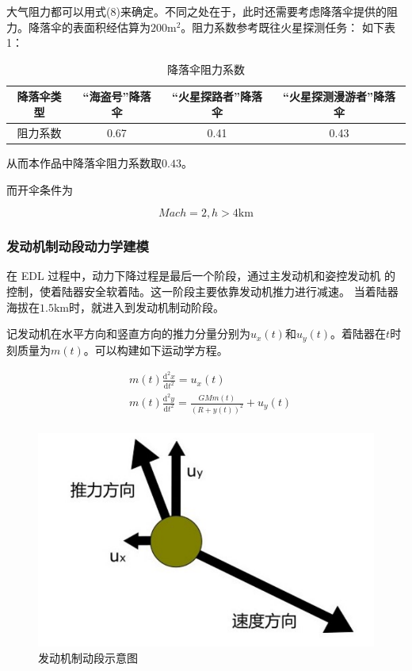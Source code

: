 \documentclass[UTF8,12pt]{ctexart}
\begin{document}
大气阻力都可以用式(8)来确定。不同之处在于，此时还需要考虑降落伞提供的阻力。降落伞的表面积经估算为$200\mathrm{m^2}$。阻力系数参考既往火星探测任务：
如下表1：

\begin{table}[htb]
	\caption{降落伞阻力系数}
	\centering
		\begin{tabular}{cccc}
		\toprule
		降落伞类型& “海盗号”降落伞& “火星探路者”降落伞	& “火星探测漫游者”降落伞\\
		\midrule
		阻力系数& 0.67&0.41&0.43\\
		\bottomrule %
		\end{tabular}
		\end{table}

		从而本作品中降落伞阻力系数取$0.43$。

而开伞条件为

\begin{equation}
Mach=2,
h>4\mathrm{km}
\end{equation}

\subsubsection{发动机制动段动力学建模}
在 EDL 过程中，动力下降过程是最后一个阶段，通过主发动机和姿控发动机
的控制，使着陆器安全软着陆。这一阶段主要依靠发动机推力进行减速。
当着陆器海拔在$1.5\mathrm{km}$时，就进入到发动机制动阶段。

记发动机在水平方向和竖直方向的推力分量分别为$u_x(t)$和$u_y(t)$。着陆器在$t$时刻质量为$m(t)$。可以构建如下运动学方程。

\begin{equation}
\begin{aligned}
&m(t)\frac{\mathrm{d}^2x}{\mathrm{d}t^2}=u_x(t)\\
&m(t)\frac{\mathrm{d}^2y}{\mathrm{d}t^2}=\frac{GMm(t)}{(R+y(t))^2}+u_y(t)\\
\end{aligned}	
\end{equation}

\begin{figure}[htb]
	\centering
	\includegraphics[width=0.6\linewidth]{发动机制动.png}
	\caption{发动机制动段示意图}
	\label{fig:pathdemo}	
\end{figure}
\end{document}
